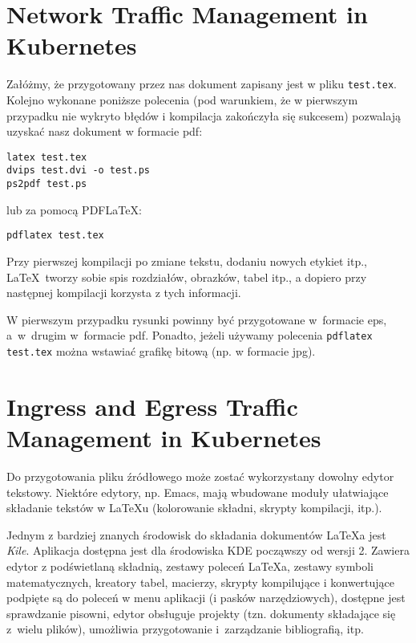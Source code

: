
\section{Network Traffic Management in Kubernetes}
\label{sec:traffic_mngmnt}


Załóżmy, że przygotowany przez nas dokument zapisany jest w pliku \texttt{test.tex}. Kolejno wykonane poniższe polecenia (pod warunkiem, że w pierwszym przypadku nie wykryto błędów i kompilacja zakończyła się sukcesem) pozwalają uzyskać nasz dokument w formacie pdf:
\begin{lstlisting}
latex test.tex
dvips test.dvi -o test.ps
ps2pdf test.ps
\end{lstlisting}
%
lub za pomocą PDF\LaTeX:
\begin{lstlisting}
pdflatex test.tex
\end{lstlisting}

Przy pierwszej kompilacji po zmiane tekstu, dodaniu nowych etykiet itp., \LaTeX~tworzy sobie spis rozdziałów, obrazków, tabel itp., a dopiero przy następnej kompilacji korzysta z tych informacji.

W pierwszym przypadku rysunki powinny być przygotowane w~formacie eps, a~w~drugim w~formacie pdf. Ponadto, jeżeli używamy polecenia \texttt{pdflatex test.tex} można wstawiać grafikę bitową (np. w formacie jpg).




\section{Ingress and Egress Traffic Management in Kubernetes}
\label{sec:ing_egr_traffic_mgmnt}


Do przygotowania pliku źródłowego może zostać wykorzystany dowolny edytor tekstowy. Niektóre edytory, np. Emacs, mają wbudowane moduły ułatwiające składanie tekstów w LaTeXu (kolorowanie składni, skrypty kompilacji, itp.).

Jednym z bardziej znanych środowisk do składania dokumentów  \LaTeX a jest {\em Kile}. Aplikacja dostępna jest dla środowiska KDE począwszy od wersji 2. Zawiera edytor z podświetlaną składnią, zestawy poleceń \LaTeX a, zestawy symboli matematycznych, kreatory tabel, macierzy, skrypty kompilujące i konwertujące podpięte są do poleceń w menu aplikacji (i pasków narzędziowych), dostępne jest sprawdzanie pisowni, edytor obsługuje projekty (tzn. dokumenty składające się z~wielu plików), umożliwia przygotowanie i~zarządzanie bibliografią, itp.

